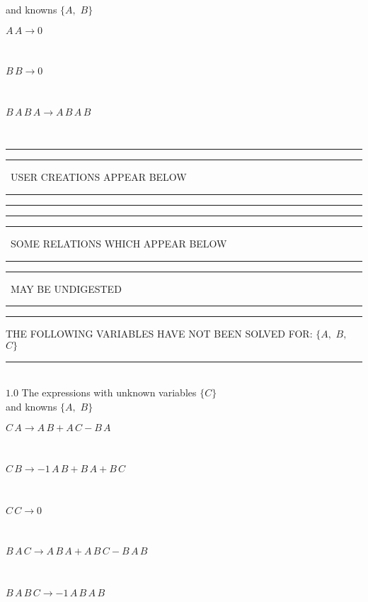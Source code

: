 \documentclass[rep10,leqno]{report}
\begin{document}
and knowns $\{A,
$ $
B\}$\smallskip\\
\begin{minipage}{6in}
$
A\,
 A\rightarrow 0
$
\end{minipage}\medskip \\
\begin{minipage}{6in}
$
B\,
 B\rightarrow 0
$
\end{minipage}\medskip \\
\begin{minipage}{6in}
$
B\,
 A\,
 B\,
 A\rightarrow A\,
 B\,
 A\,
 B
$
\end{minipage}\\
\rule[2pt]{6in}{1pt}\hfil\break
\rule[2.5pt]{1.701in}{1pt}
\ USER CREATIONS APPEAR BELOW\ 
\rule[2.5pt]{1.701in}{1pt}\hfil\break
\rule[2pt]{6in}{1pt}\hfil\break
\rule[2pt]{6in}{4pt}\hfil\break
\rule[2pt]{1.45in}{4pt}
\ SOME RELATIONS WHICH APPEAR BELOW\ 
\rule[2pt]{1.45in}{4pt}\hfil\break
\rule[2pt]{2.18in}{4pt}
\ MAY BE UNDIGESTED\ 
\rule[2pt]{2.18in}{4pt}\hfil\break
\rule[2pt]{6in}{4pt}\hfil\break
THE FOLLOWING VARIABLES HAVE NOT BEEN SOLVED FOR:\hfil\break
$\{A,
$ $
B,
$ $
C\}$
\smallskip\\
\rule[3pt]{6in}{.7pt}\\
$1.0$  The expressions with unknown variables $\{C\}$\\
and knowns $\{A,
$ $
B\}$\smallskip\\
\begin{minipage}{6in}
$
C\,
 A\rightarrow A\,
 B + A\,
 C - B\,
 A
$
\end{minipage}\medskip \\
\begin{minipage}{6in}
$
C\,
 B\rightarrow -1\,
 A\,
 B + B\,
 A + B\,
 C
$
\end{minipage}\medskip \\
\begin{minipage}{6in}
$
C\,
 C\rightarrow 0
$
\end{minipage}\medskip \\
\begin{minipage}{6in}
$
B\,
 A\,
 C\rightarrow A\,
 B\,
 A + A\,
 B\,
 C - B\,
 A\,
 B
$
\end{minipage}\medskip \\
\begin{minipage}{6in}
$
B\,
 A\,
 B\,
 C\rightarrow -1\,
 A\,
 B\,
 A\,
 B
$
\end{minipage}\\
\vspace{10pt}
\end{document}

